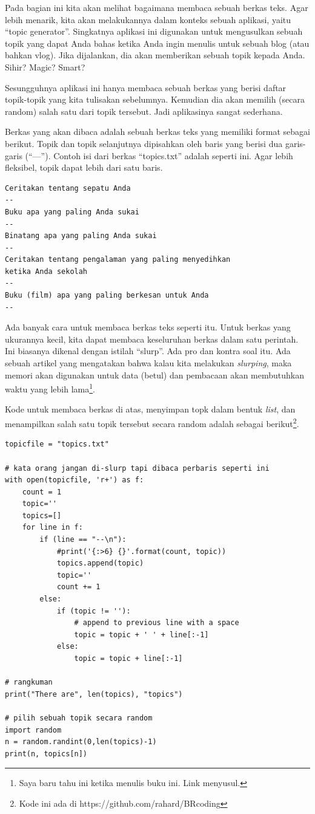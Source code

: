 Pada bagian ini kita akan melihat bagaimana membaca sebuah berkas teks.
Agar lebih menarik, kita akan melakukannya dalam konteks sebuah aplikasi,
yaitu ``topic generator''. Singkatnya aplikasi ini digunakan untuk
mengusulkan sebuah topik yang dapat Anda bahas ketika Anda ingin
menulis untuk sebuah blog (atau bahkan vlog).
Jika dijalankan, dia akan memberikan sebuah topik kepada Anda.
Sihir? Magic? Smart?

Sesungguhnya aplikasi ini hanya membaca sebuah berkas yang berisi 
daftar topik-topik yang kita tulisakan sebelumnya. Kemudian dia 
akan memilih (secara random) salah satu dari topik tersebut.
Jadi aplikasinya sangat sederhana. 

Berkas yang akan dibaca adalah sebuah berkas teks yang memiliki
format sebagai berikut. Topik dan topik selanjutnya dipisahkan oleh
baris yang berisi dua garis-garis (``---''). Contoh isi dari
berkas ``topics.txt'' adalah seperti ini.
Agar lebih fleksibel, topik dapat lebih dari satu baris.

\begin{verbatim}
Ceritakan tentang sepatu Anda
--
Buku apa yang paling Anda sukai
--
Binatang apa yang paling Anda sukai
--
Ceritakan tentang pengalaman yang paling menyedihkan
ketika Anda sekolah
--
Buku (film) apa yang paling berkesan untuk Anda
--
\end{verbatim}


Ada banyak cara untuk membaca berkas teks seperti itu.
Untuk berkas yang ukurannya kecil, kita dapat membaca keseluruhan
berkas dalam satu perintah. Ini biasanya dikenal dengan istilah ``slurp''.
Ada pro dan kontra soal itu.
Ada sebuah artikel yang mengatakan bahwa kalau kita melakukan {\em slurping},
maka memori akan digunakan untuk data (betul) dan pembacaan
akan membutuhkan waktu yang lebih lama\footnote{Saya baru tahu ini ketika
menulis buku ini. Link menyusul.}.

Kode untuk membaca berkas di atas, menyimpan topk dalam
bentuk {\em list}, dan menampilkan salah satu topik tersebut
secara random adalah sebagai berikut\footnote{Kode ini ada di 
https://github.com/rahard/BRcoding}.

\begin{verbatim}
topicfile = "topics.txt"

# kata orang jangan di-slurp tapi dibaca perbaris seperti ini
with open(topicfile, 'r+') as f:
    count = 1 
    topic=''
    topics=[]
    for line in f:
        if (line == "--\n"):
            #print('{:>6} {}'.format(count, topic))
            topics.append(topic)
            topic=''
            count += 1
        else:
            if (topic != ''):
                # append to previous line with a space
                topic = topic + ' ' + line[:-1]
            else:
                topic = topic + line[:-1] 

# rangkuman
print("There are", len(topics), "topics")

# pilih sebuah topik secara random
import random
n = random.randint(0,len(topics)-1)
print(n, topics[n])
\end{verbatim}

